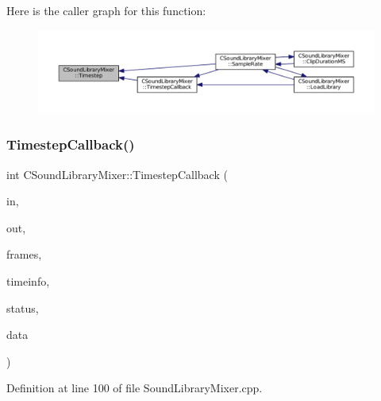 Here is the caller graph for this function\+:\nopagebreak
\begin{figure}[H]
\begin{center}
\leavevmode
\includegraphics[width=350pt]{classCSoundLibraryMixer_ad3ef0b67b77862e8c88949c3415095e7_icgraph}
\end{center}
\end{figure}
\hypertarget{classCSoundLibraryMixer_a1d04553aa93769b8bff4bb5c8b7bdfa1}{}\label{classCSoundLibraryMixer_a1d04553aa93769b8bff4bb5c8b7bdfa1} 
\subsubsection{\texorpdfstring{Timestep\+Callback()}{TimestepCallback()}}
{\footnotesize\ttfamily int C\+Sound\+Library\+Mixer\+::\+Timestep\+Callback (\begin{DoxyParamCaption}\item[{const void $\ast$}]{in,  }\item[{void $\ast$}]{out,  }\item[{unsigned long}]{frames,  }\item[{const Pa\+Stream\+Callback\+Time\+Info $\ast$}]{timeinfo,  }\item[{Pa\+Stream\+Callback\+Flags}]{status,  }\item[{void $\ast$}]{data }\end{DoxyParamCaption})\hspace{0.3cm}{\ttfamily [static]}}



Definition at line 100 of file Sound\+Library\+Mixer.\+cpp.


